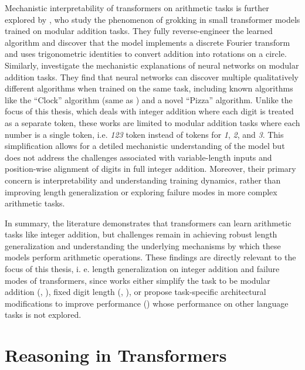 Mechanistic interpretability of transformers on arithmetic tasks is further explored by \cite{nanda_progress_2022}, who study the phenomenon of grokking in small transformer models trained on modular addition tasks. They fully reverse-engineer the learned algorithm and discover that the model implements a discrete Fourier transform and uses trigonometric identities to convert addition into rotations on a circle. Similarly, \cite{zhong_clock_2023} investigate the mechanistic explanations of neural networks on modular addition tasks. They find that neural networks can discover multiple qualitatively different algorithms when trained on the same task, including known algorithms like the ``Clock'' algorithm (same as \cite{nanda_progress_2022}) and a novel ``Pizza'' algorithm. Unlike the focus of this thesis, which deals with integer addition where each digit is treated as a separate token, these works are limited to modular addition tasks where each number is a single token, i.e. \emph{123} token instead of tokens for \emph{1}, \emph{2}, and \emph{3}. This simplification allows for a detiled mechanistic understanding of the model but does not address the challenges associated with variable-length inputs and position-wise alignment of digits in full integer addition. Moreover, their primary concern is interpretability and understanding training dynamics, rather than improving length generalization or exploring failure modes in more complex arithmetic tasks.

In summary, the literature demonstrates that transformers can learn arithmetic tasks like integer addition, but challenges remain in achieving robust length generalization and understanding the underlying mechanisms by which these models perform arithmetic operations. These findings are directly relevant to the focus of this thesis, i. e. length generalization on integer addition and failure modes of transformers, since works either simplify the task to be modular addition (\cite{nanda_progress_2022}, \cite{zhong_clock_2023}), fixed digit length (\cite{lee_teaching_2023}, \cite{quirke_understanding_2023}), or propose task-specific architectural modifications to improve performance (\cite{mcleish_transformers_2024}) whose performance on other language tasks is not explored.

\section{Reasoning in Transformers}\label{sec:sota_reasoning_in_transformers}

